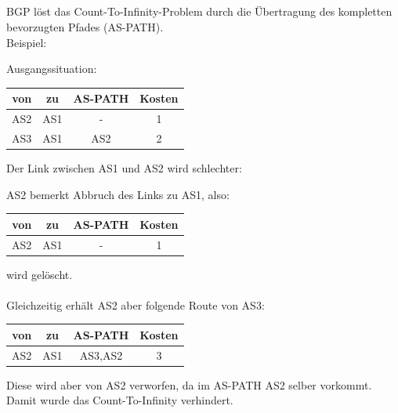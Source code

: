 \documentclass[a4paper,
			llpt,
			solution,
			accentcolor=tud2d,
			colorbacktitle
			]
			{tudexercise}
\newcommand{\8}{$\infty$}
\begin{document}
\subsection{}
BGP löst das Count-To-Infinity-Problem durch die Übertragung des kompletten bevorzugten Pfades (AS-PATH).
\\
Beispiel:
\begin{multicols}{2}
Ausgangssituation:
\begin{center}
\begin{tabular}{c|c|c|c}
von &  zu  &  AS-PATH &  Kosten \\ \hline
AS2 &  AS1 &   -      &   1 \\
AS3 &  AS1 &   AS2    &   2 \\
\end{tabular}
\end{center}
Der Link zwischen AS1 und AS2 wird schlechter:
\begin{center}
\end{center}
AS2 bemerkt Abbruch des Links zu AS1, also:
\begin{center}
\begin{tabular}{c|c|c|c}
von &  zu &   AS-PATH &  Kosten \\ \hline
AS2 &  AS1 &   -    &    1 \\
\end{tabular}
\end{center}
wird gelöscht.\\
~\\
Gleichzeitig erhält AS2 aber folgende Route von AS3:
\begin{center}
\begin{tabular}{c|c|c|c}
von &  zu  &  AS-PATH &  Kosten \\ \hline
AS2 &  AS1 &  AS3,AS2  &  3 \\
\end{tabular}
\end{center}
Diese wird aber von AS2 verworfen, da im AS-PATH AS2 selber vorkommt. Damit wurde das Count-To-Infinity verhindert.
\end{multicols}
\end{document}
